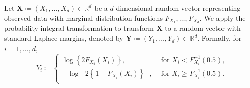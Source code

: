 \documentclass[12pt,compact]{article}
\begin{document}
Let $\symbf{X} \coloneqq (X_1, \ldots, X_d) \in \mathbb{R}^d$ be a $d$-dimensional random vector representing observed data with marginal distribution functions $F_{X_1}, \ldots, F_{X_d}$.
We apply the probability integral transformation to transform $\symbf{X}$ to a random vector with standard Laplace margins, denoted by $\symbf{Y} \coloneqq (Y_1, \ldots, Y_d) \in \mathbb{R}^d$.
Formally, for $i = 1, \ldots, d$, 
\begin{equation}\label{eq:laplace}
  Y_i \coloneqq \begin{cases}
    \log\left\{2F_{X_i}(X_i)\right\}, &\text{ for } X_i < F_{X_i}^{-1}(0.5), \\
    -\log\left[2\left\{ 1 - F_{X_i}(X_i)\right\} \right], &\text{ for } X_i \ge F_{X_i}^{-1}(0.5). \\
  \end{cases}
\end{equation}
\end{document}
